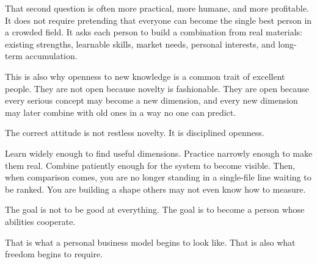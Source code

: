 That second question is often more practical, more humane, and more profitable. It does not require pretending that everyone can become the single best person in a crowded field. It asks each person to build a combination from real materials: existing strengths, learnable skills, market needs, personal interests, and long-term accumulation.

This is also why openness to new knowledge is a common trait of excellent people. They are not open because novelty is fashionable. They are open because every serious concept may become a new dimension, and every new dimension may later combine with old ones in a way no one can predict.

The correct attitude is not restless novelty. It is disciplined openness.

Learn widely enough to find useful dimensions. Practice narrowly enough to make them real. Combine patiently enough for the system to become visible. Then, when comparison comes, you are no longer standing in a single-file line waiting to be ranked. You are building a shape others may not even know how to measure.

The goal is not to be good at everything. The goal is to become a person whose abilities cooperate.

That is what a personal business model begins to look like. That is also what freedom begins to require.
